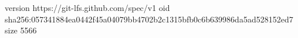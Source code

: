 version https://git-lfs.github.com/spec/v1
oid sha256:057341884ea0442f45a04079bb4702b2c1315bfb0c6b639986da5ad528152ed7
size 5566
